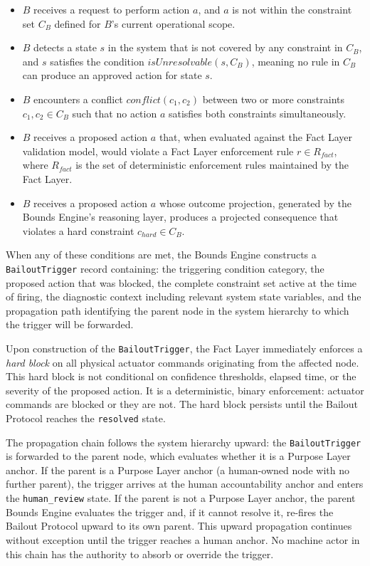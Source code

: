 \begin{itemize}
\item $B$ receives a request to perform action $a$, and $a$ is not within the constraint set $C_B$ defined for $B$'s current operational scope.
\item $B$ detects a state $s$ in the system that is not covered by any constraint in $C_B$, and $s$ satisfies the condition $isUnresolvable(s, C_B)$, meaning no rule in $C_B$ can produce an approved action for state $s$.
\item $B$ encounters a conflict $conflict(c_1, c_2)$ between two or more constraints $c_1, c_2 \in C_B$ such that no action $a$ satisfies both constraints simultaneously.
\item $B$ receives a proposed action $a$ that, when evaluated against the Fact Layer validation model, would violate a Fact Layer enforcement rule $r \in R_{fact}$, where $R_{fact}$ is the set of deterministic enforcement rules maintained by the Fact Layer.
\item $B$ receives a proposed action $a$ whose outcome projection, generated by the Bounds Engine's reasoning layer, produces a projected consequence that violates a hard constraint $c_{hard} \in C_B$.
\end{itemize}

When any of these conditions are met, the Bounds Engine constructs a \texttt{BailoutTrigger} record containing: the triggering condition category, the proposed action that was blocked, the complete constraint set active at the time of firing, the diagnostic context including relevant system state variables, and the propagation path identifying the parent node in the system hierarchy to which the trigger will be forwarded.

Upon construction of the \texttt{BailoutTrigger}, the Fact Layer immediately enforces a \textit{hard block} on all physical actuator commands originating from the affected node. This hard block is not conditional on confidence thresholds, elapsed time, or the severity of the proposed action. It is a deterministic, binary enforcement: actuator commands are blocked or they are not. The hard block persists until the Bailout Protocol reaches the \texttt{resolved} state.

The propagation chain follows the system hierarchy upward: the \texttt{BailoutTrigger} is forwarded to the parent node, which evaluates whether it is a Purpose Layer anchor. If the parent is a Purpose Layer anchor (a human-owned node with no further parent), the trigger arrives at the human accountability anchor and enters the \texttt{human\_review} state. If the parent is not a Purpose Layer anchor, the parent Bounds Engine evaluates the trigger and, if it cannot resolve it, re-fires the Bailout Protocol upward to its own parent. This upward propagation continues without exception until the trigger reaches a human anchor. No machine actor in this chain has the authority to absorb or override the trigger.

